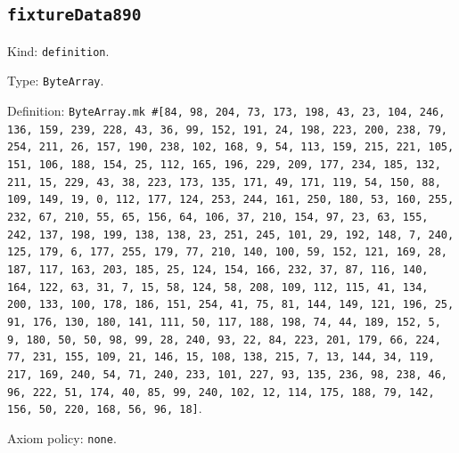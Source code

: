 \documentclass[11pt]{article}
\begin{document}
\subsection*{\texttt{fixtureData890}}
\noindent Kind: \texttt{definition}.\par
\noindent Type: \texttt{ByteArray}.\par
\noindent Definition: \texttt{ByteArray.mk \#[84, 98, 204, 73, 173, 198, 43, 23, 104, 246, 136, 159, 239, 228, 43, 36, 99, 152, 191, 24, 198, 223, 200, 238, 79, 254, 211, 26, 157, 190, 238, 102, 168, 9, 54, 113, 159, 215, 221, 105, 151, 106, 188, 154, 25, 112, 165, 196, 229, 209, 177, 234, 185, 132, 211, 15, 229, 43, 38, 223, 173, 135, 171, 49, 171, 119, 54, 150, 88, 109, 149, 19, 0, 112, 177, 124, 253, 244, 161, 250, 180, 53, 160, 255, 232, 67, 210, 55, 65, 156, 64, 106, 37, 210, 154, 97, 23, 63, 155, 242, 137, 198, 199, 138, 138, 23, 251, 245, 101, 29, 192, 148, 7, 240, 125, 179, 6, 177, 255, 179, 77, 210, 140, 100, 59, 152, 121, 169, 28, 187, 117, 163, 203, 185, 25, 124, 154, 166, 232, 37, 87, 116, 140, 164, 122, 63, 31, 7, 15, 58, 124, 58, 208, 109, 112, 115, 41, 134, 200, 133, 100, 178, 186, 151, 254, 41, 75, 81, 144, 149, 121, 196, 25, 91, 176, 130, 180, 141, 111, 50, 117, 188, 198, 74, 44, 189, 152, 5, 9, 180, 50, 50, 98, 99, 28, 240, 93, 22, 84, 223, 201, 179, 66, 224, 77, 231, 155, 109, 21, 146, 15, 108, 138, 215, 7, 13, 144, 34, 119, 217, 169, 240, 54, 71, 240, 233, 101, 227, 93, 135, 236, 98, 238, 46, 96, 222, 51, 174, 40, 85, 99, 240, 102, 12, 114, 175, 188, 79, 142, 156, 50, 220, 168, 56, 96, 18]}.\par
\noindent Axiom policy: \texttt{none}.\par
\end{document}
